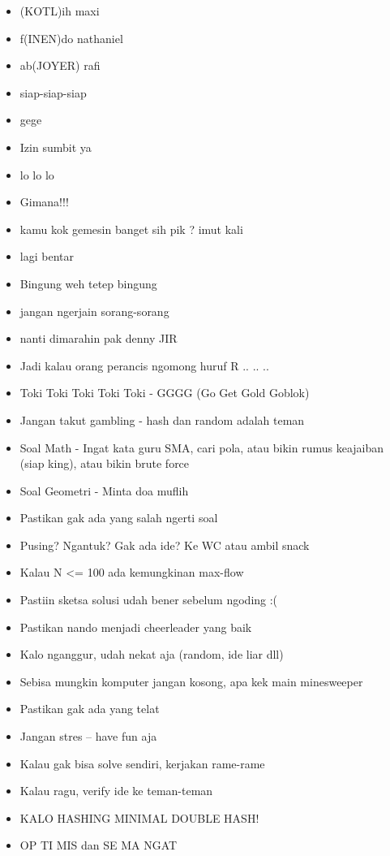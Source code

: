 \begin{itemize}
  \item (KOTL)ih maxi
  \item f(INEN)do nathaniel
  \item ab(JOYER) rafi
  \item siap-siap-siap
  \item gege
  \item Izin sumbit ya
  \item lo lo lo
  \item Gimana!!!
  \item kamu kok gemesin banget sih pik ? imut kali
  \item lagi bentar
  \item Bingung weh tetep bingung
  \item jangan ngerjain sorang-sorang
  \item nanti dimarahin pak denny JIR
  \item Jadi kalau orang perancis ngomong huruf R .. .. ..
  \item Toki Toki Toki Toki Toki - GGGG (Go Get Gold Goblok)
  \item Jangan takut gambling - hash dan random adalah teman
  \item Soal Math - Ingat kata guru SMA, cari pola, atau bikin rumus keajaiban (siap king), atau bikin brute force
  \item Soal Geometri - Minta doa muflih
  \item Pastikan gak ada yang salah ngerti soal 
  \item Pusing? Ngantuk? Gak ada ide? Ke WC atau ambil snack
  \item Kalau N <= 100 ada kemungkinan max-flow
  \item Pastiin sketsa solusi udah bener sebelum ngoding :(
  \item Pastikan nando menjadi cheerleader yang baik
  \item Kalo nganggur, udah nekat aja (random, ide liar dll)
  \item Sebisa mungkin komputer jangan kosong, apa kek main minesweeper
  \item Pastikan gak ada yang telat
  \item Jangan stres -- have fun aja
  \item Kalau gak bisa solve sendiri, kerjakan rame-rame
  \item Kalau ragu, verify ide ke teman-teman
  \item KALO HASHING MINIMAL DOUBLE HASH!
  \item OP TI MIS dan SE MA NGAT
\end{itemize}
